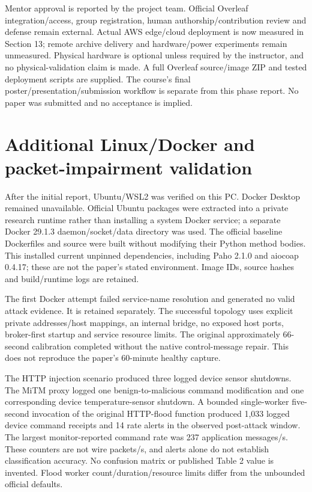 \documentclass[11pt,a4paper]{article}
\begin{document}
Mentor approval is reported by the project team. Official Overleaf integration/access, group registration, human authorship/contribution review and defense remain external. Actual AWS edge/cloud deployment is now measured in Section 13; remote archive delivery and hardware/power experiments remain unmeasured. Physical hardware is optional unless required by the instructor, and no physical-validation claim is made. A full Overleaf source/image ZIP and tested deployment scripts are supplied. The course's final poster/presentation/submission workflow is separate from this phase report. No paper was submitted and no acceptance is implied.


\section{Additional Linux/Docker and packet-impairment validation}

After the initial report, Ubuntu/WSL2 was verified on this PC. Docker Desktop remained unavailable. Official Ubuntu packages were extracted into a private research runtime rather than installing a system Docker service; a separate Docker 29.1.3 daemon/socket/data directory was used. The official baseline Dockerfiles and source were built without modifying their Python method bodies. This installed current unpinned dependencies, including Paho 2.1.0 and aiocoap 0.4.17; these are not the paper's stated environment. Image IDs, source hashes and build/runtime logs are retained.


The first Docker attempt failed service-name resolution and generated no valid attack evidence. It is retained separately. The successful topology uses explicit private addresses/host mappings, an internal bridge, no exposed host ports, broker-first startup and service resource limits. The original approximately 66-second calibration completed without the native control-message repair. This does not reproduce the paper's 60-minute healthy capture.


The HTTP injection scenario produced three logged device sensor shutdowns. The MiTM proxy logged one benign-to-malicious command modification and one corresponding device temperature-sensor shutdown. A bounded single-worker five-second invocation of the original HTTP-flood function produced 1,033 logged device command receipts and 14 rate alerts in the observed post-attack window. The largest monitor-reported command rate was 237 application messages/s. These counters are not wire packets/s, and alerts alone do not establish classification accuracy. No confusion matrix or published Table 2 value is invented. Flood worker count/duration/resource limits differ from the unbounded official defaults.
\end{document}
